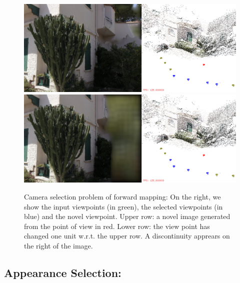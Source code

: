 \begin{figure}[t]
	\centering
	\includegraphics[scale=0.22]{graphics/cam_selection_problem_1.png}
	\includegraphics[scale=0.22]{graphics/cam_selection_problem_2.png}	
	\caption{\label{fig:cam_select_problem} 
		Camera selection problem of forward mapping: On the right, we show the input viewpoints (in green), the selected viewpoints (in blue) and the novel viewpoint. Upper row: a novel image generated from the point of view in red. Lower row: the view point has changed one unit w.r.t. the upper row. A discontinuity apprears on the right of the image.}
\end{figure}


\subsection{Appearance Selection:}

